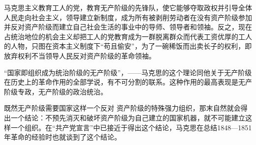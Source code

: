马克思主义教育工人的党，教育无产阶级的先锋队，使它能够夺取政权并{\kaishu 引导全体人民}走向社会主义，领导建立新制度，成为所有被剥削劳动者在没有资产阶级参加并反对资产阶级而建立自己社会生活的事业中的导师、领导者和领袖。反之，现在占统治地位的机会主义却把工人的党教育成为一群脱离群众而代表工资优厚的工人的人物，只图在资本主义制度下“苟且偷安”，为了一碗稀饭而出卖长子的权利，即放弃权利不当领导人民反对资产阶级的革命领袖。

“国家即组织成为统治阶级的无产阶级”，——马克思的这个理论同他关于无产阶级在历史上的革命作用的全部学说，有不可分割的联系。这种作用的最高表现是无产阶级专政，无产阶级的政治统治。

既然无产阶级需要国家这样一个{\kaishu 反对} 资产阶级的{\kaishu 特殊}强力组织，那末自然就会得出一个结论：不预先消灭和破坏资产阶级为自己建立的国家机器，就不可能建立这样一个组织。在“共产党宣言”中已接近于得出这个结论，马克思在总结1848—1851年革命的经验时也就谈到了这个结论。
























